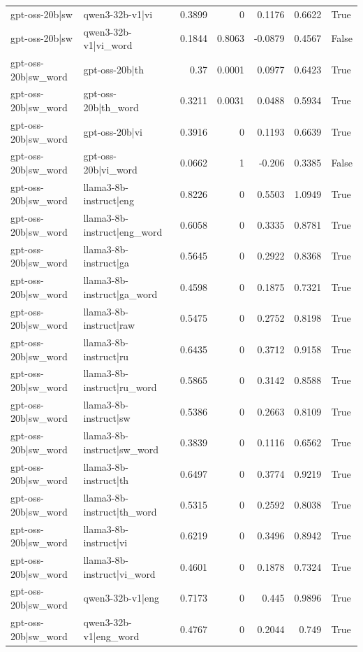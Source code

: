 \begin{table}
\begin{tabular}{l l r r r r l}
gpt-oss-20b|sw & qwen3-32b-v1|vi & 0.3899 & 0 & 0.1176 & 0.6622 & True \\
gpt-oss-20b|sw & qwen3-32b-v1|vi_word & 0.1844 & 0.8063 & -0.0879 & 0.4567 & False \\
gpt-oss-20b|sw_word & gpt-oss-20b|th & 0.37 & 0.0001 & 0.0977 & 0.6423 & True \\
gpt-oss-20b|sw_word & gpt-oss-20b|th_word & 0.3211 & 0.0031 & 0.0488 & 0.5934 & True \\
gpt-oss-20b|sw_word & gpt-oss-20b|vi & 0.3916 & 0 & 0.1193 & 0.6639 & True \\
gpt-oss-20b|sw_word & gpt-oss-20b|vi_word & 0.0662 & 1 & -0.206 & 0.3385 & False \\
gpt-oss-20b|sw_word & llama3-8b-instruct|eng & 0.8226 & 0 & 0.5503 & 1.0949 & True \\
gpt-oss-20b|sw_word & llama3-8b-instruct|eng_word & 0.6058 & 0 & 0.3335 & 0.8781 & True \\
gpt-oss-20b|sw_word & llama3-8b-instruct|ga & 0.5645 & 0 & 0.2922 & 0.8368 & True \\
gpt-oss-20b|sw_word & llama3-8b-instruct|ga_word & 0.4598 & 0 & 0.1875 & 0.7321 & True \\
gpt-oss-20b|sw_word & llama3-8b-instruct|raw & 0.5475 & 0 & 0.2752 & 0.8198 & True \\
gpt-oss-20b|sw_word & llama3-8b-instruct|ru & 0.6435 & 0 & 0.3712 & 0.9158 & True \\
gpt-oss-20b|sw_word & llama3-8b-instruct|ru_word & 0.5865 & 0 & 0.3142 & 0.8588 & True \\
gpt-oss-20b|sw_word & llama3-8b-instruct|sw & 0.5386 & 0 & 0.2663 & 0.8109 & True \\
gpt-oss-20b|sw_word & llama3-8b-instruct|sw_word & 0.3839 & 0 & 0.1116 & 0.6562 & True \\
gpt-oss-20b|sw_word & llama3-8b-instruct|th & 0.6497 & 0 & 0.3774 & 0.9219 & True \\
gpt-oss-20b|sw_word & llama3-8b-instruct|th_word & 0.5315 & 0 & 0.2592 & 0.8038 & True \\
gpt-oss-20b|sw_word & llama3-8b-instruct|vi & 0.6219 & 0 & 0.3496 & 0.8942 & True \\
gpt-oss-20b|sw_word & llama3-8b-instruct|vi_word & 0.4601 & 0 & 0.1878 & 0.7324 & True \\
gpt-oss-20b|sw_word & qwen3-32b-v1|eng & 0.7173 & 0 & 0.445 & 0.9896 & True \\
gpt-oss-20b|sw_word & qwen3-32b-v1|eng_word & 0.4767 & 0 & 0.2044 & 0.749 & True \\

\end{tabular}
\end{table}

